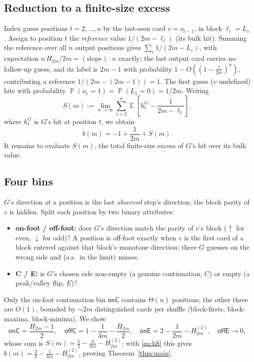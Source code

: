 \documentclass[11pt]{article}
\theoremstyle{definition}
\DeclareMathOperator{\PP}{\mathbb{P}}
\DeclareMathOperator{\EE}{\mathbb{E}}
\newcommand{\bigoh}{O}
\begin{document}
\subsection{Reduction to a finite-size excess}
Index guess positions $t=2,\dots,n$ by the last-seen card $v=o_{t-1}$, in block $\ell_t=L_v$.
Assign to position $t$ the \emph{reference} value $1/(2m-\ell_t)$ (its bulk hit). Summing the
reference over all $n$ output positions gives $\sum_{c}1/(2m-L_c)$, with expectation
$n\,H_{2m}/2m=(\text{slope})\cdot n$ exactly; the last output card carries no follow-up guess,
and its label is $2m-1$ with probability $1-\bigoh((1-\tfrac1{2m})^n)$, contributing a
reference $1/(2m-(2m-1))=1$. The first guess ($v$ undefined) hits with probability
$\PP(o_1=1)=\PP(L_1=0)=1/2m$. Writing
\[
  S(m):=\lim_{n\to\infty}\sum_{t=2}^{n}\EE\!\left[h_t^{G}-\frac{1}{2m-\ell_t}\right],
\]
where $h^G_t$ is $G$'s hit at position $t$, we obtain
\begin{equation}\label{eq:bS}
  b(m)=-1+\frac1{2m}+S(m).
\end{equation}
It remains to evaluate $S(m)$, the total finite-size excess of $G$'s hit over its bulk value.

\subsection{Four bins}
$G$'s direction at a position is the last \emph{observed} step's direction; the block parity
of $v$ is hidden. Split each position by two binary attributes:
\begin{itemize}[topsep=2pt,itemsep=1pt]
  \item \textbf{on-foot / off-foot:} does $G$'s direction match the parity of $v$'s block
        ($\uparrow$ for even, $\downarrow$ for odd)? A position is off-foot exactly when $v$ is
        the first card of a block entered against that block's monotone direction; there $G$
        guesses on the wrong side and (a.s.\ in the limit) misses.
  \item \textbf{C / E:} is $G$'s chosen side non-empty (a genuine continuation, $C$) or empty
        (a peak/valley flip, $E$)?
\end{itemize}
Only the on-foot continuation bin $\mathsf{onC}$ contains $\Theta(n)$ positions; the other
three are $\bigoh(1)$, bounded by $\sim2m$ distinguished cards per shuffle (block-firsts,
block-maxima, block-minima). We show
\begin{equation}\label{eq:pieces}
  \mathsf{onC}=\frac{H_{2m}-1}{2},\quad
  \mathsf{offC}=1-\frac1{4m}-\frac{H_{2m}}{2},\quad
  \mathsf{onE}=2-\frac1{2m}-H_{2m}^{(2)},\quad
  \mathsf{offE}\to0,
\end{equation}
whose sum is $S(m)=\tfrac52-\tfrac{3}{4m}-H_{2m}^{(2)}$; with \eqref{eq:bS} this gives
$b(m)=\tfrac32-\tfrac1{4m}-H_{2m}^{(2)}$, proving Theorem~\ref{thm:main}.
\end{document}
